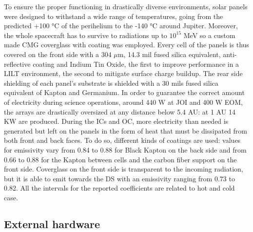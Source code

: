     To ensure the proper functioning in drastically diverse environments, solar panels were designed to withstand a wide range of temperatures, going from the predicted +100 °C of the perihelium to the -140 °C around Jupiter\cite{solar_panels_coef}. Moreover, the whole spacecraft has to survive to radiations up to $10^{15}$ MeV so a custom made CMG coverglass with coating was employed. Every cell of the panels is thus covered on the front side with a 304 $\mu$m, 14.3 mil fused silica equivalent\cite{solar_panels_coef}, anti-reflective coating and Indium Tin Oxide, the first to improve performance in a LILT environment, the second to mitigate surface charge buildup\cite{solar_panels_coef}. The rear side shielding of each panel's substrate is shielded with a 30 mils fused silica equivalent of Kapton and Germanium. In order to guarantee the correct amount of electricity during science operations, around 440 W at JOI and 400 W EOM, the arrays are drastically oversized at any distance below 5.4 AU: at 1 AU 14 KW are produced. During the ICs and OC, more electricity than needed is generated but left on the panels in the form of heat that must be dissipated from both front and back faces. To do so, different kinds of coatings are used: %
    values for emissivity vary from 0.84 to 0.88 for Black Kapton on the back side and from 0.66 to 0.88 for the Kapton between cells and the carbon fiber support on the front side. Coverglass on the front side is transparent to the incoming radiation, but it is able to emit towards the DS with an emissivity ranging from 0.73 to 0.82. All the intervals for the reported coefficients are related to hot and cold case\cite{solar_panels_coef}.

    
    \subsection{External hardware}
    \label{subsec:external_hardware}

